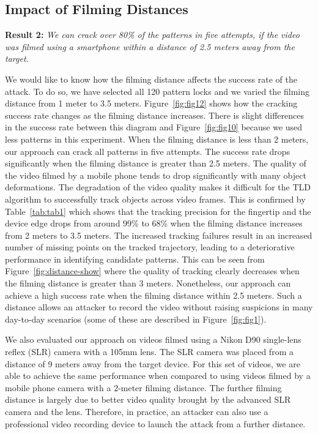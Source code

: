     \subsection{Impact of Filming Distances \label{sec:distances}}


        \noindent \textbf{Result 2:} \emph{We can crack over 80\% of the patterns in five attempts, if the video was filmed using a smartphone within a distance of 2.5 meters away from the target.}

           We would like to know how the filming distance affects the
           success rate of the attack. To do so, we have selected all 120
           pattern locks and we varied the
           filming distance from 1 meter to 3.5 meters.
           Figure~\ref{fig:fig12} shows how the cracking success rate changes
           as the filming distance increases. There is slight differences in the success rate between this diagram and Figure~\ref{fig:fig10}
            because we used less patterns in this experiment.
           When the filming distance is less than 2 meters, our approach can crack all patterns in five attempts.
           The success rate drops significantly when
           the filming distance is greater than 2.5 meters.
           The quality of the video filmed by a mobile phone tends to drop significantly with many object deformations. The degradation of the video quality makes it difficult for the TLD algorithm to successfully track objects across video frames.
            This is confirmed by Table~\ref{tab:tab1}
           which shows that the tracking precision for the fingertip and the device edge drops from around 99\% to
           68\% when the filming
           distance increases from 2 meters to 3.5 meters. The increased
           tracking failures result in an increased number of missing
           points on the tracked trajectory, leading to a deteriorative performance in identifying candidate patterns.
           This can be seen from Figure~\ref{fig:distance-show} where the quality
           of tracking clearly decreases when the filming distance is greater
           than 3 meters.
           Nonetheless, our approach can
           achieve a high success rate when the filming distance within
           2.5 meters. Such a distance allows an attacker to
           record the video without raising suspicions in many day-to-day scenarios (some of these are
           described in Figure~\ref{fig:fig1}).

            We also evaluated our approach on videos filmed using a Nikon D90
            single-lens reflex (SLR) camera with a 105mm lens. The SLR camera
            was placed from a distance of 9 meters away from the target
            device. For this set of videos, we are able to achieve the same
            performance when compared to using videos filmed by a mobile
            phone camera with a 2-meter filming distance. The further filming
            distance is largely due to better video quality brought by the advanced
            SLR camera and the lens. Therefore, in practice, an attacker can
            also use a professional video recording device to launch the
            attack from a further distance.

